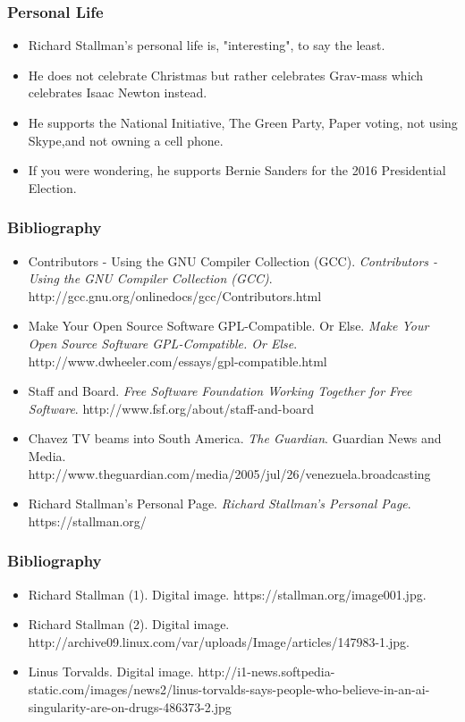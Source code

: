 \documentclass{beamer}
\begin{document}
\begin{frame}\frametitle{Personal Life}
  \begin{itemize}
    \item Richard Stallman's personal life is, "interesting", to say the least.
    \item He does not celebrate Christmas but rather celebrates Grav-mass which celebrates Isaac Newton instead.
    \item He supports the National Initiative, The Green Party, Paper voting, not using Skype,and not owning a cell phone.
    \item If you were wondering, he supports Bernie Sanders for the 2016 Presidential Election.
  \end{itemize}
\end{frame}

\begin{frame}\frametitle{Bibliography}
  \begin{itemize}
    \item Contributors - Using the GNU Compiler Collection (GCC). \textit{Contributors - Using the GNU Compiler Collection (GCC)}. http://gcc.gnu.org/onlinedocs/gcc/Contributors.html
    \item Make Your Open Source Software GPL-Compatible. Or Else. \textit{Make Your Open Source Software GPL-Compatible. Or Else}. http://www.dwheeler.com/essays/gpl-compatible.html
    \item Staff and Board. \textit{Free Software Foundation Working Together for Free Software}. http://www.fsf.org/about/staff-and-board
    \item Chavez TV beams into South America. \textit{The Guardian}. Guardian News and Media. http://www.theguardian.com/media/2005/jul/26/venezuela.broadcasting
    \item Richard Stallman's Personal Page. \textit{Richard Stallman's Personal Page}. https://stallman.org/
  \end{itemize}
\end{frame}

\begin{frame}\frametitle{Bibliography}
  \begin{itemize}
    \item Richard Stallman (1). Digital image. https://stallman.org/image001.jpg.
    \item Richard Stallman (2). Digital image. http://archive09.linux.com/var/uploads/Image/articles/147983-1.jpg.
    \item Linus Torvalds. Digital image. http://i1-news.softpedia-static.com/images/news2/linus-torvalds-says-people-who-believe-in-an-ai-singularity-are-on-drugs-486373-2.jpg
  \end{itemize}
\end{frame}
\end{document}
